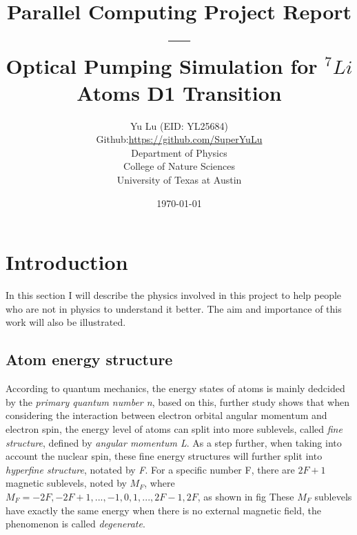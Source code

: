 \documentclass[a4paper, 10pt]{article}
\title{Parallel Computing Project Report --- \\ Optical Pumping Simulation for  $^{7}Li$ Atoms D1 Transition}
\author{
  Yu Lu (EID: YL25684) \\
  Github:\url{https://github.com/SuperYuLu}\\
  Department of Physics \\
  College of Nature Sciences \\
  University of Texas at Austin}
\date{\today}
\begin{document}
\titlepage
\maketitle
\tableofcontents
\newpage
\section{Introduction}
In this section I will describe the physics involved in this project to help people who are not in physics to understand it better. The aim and importance of this work will also be illustrated.

\subsection{Atom energy structure}
According to quantum mechanics, the energy states of atoms is mainly dedcided by the \textit{primary quantum number n}, based on this, further study shows that when considering the interaction between electron orbital angular momentum and electron spin, the energy level of atoms can split into more sublevels, called \textit{fine structure}, defined by \textit{angular momentum L}. As a step further, when taking into account the nuclear spin, these fine energy structures will further split into \textit{hyperfine structure}, notated by \textit{F}. For a specific number F, there are $2F+1$ magnetic sublevels, noted by $M_F$, where $M_F = -2F,  -2F + 1, ..., -1, 0, 1, ..., 2F-1, 2F$, as shown  in fig %
These $M_F$ sublevels have exactly the same energy when there is no external magnetic field, the phenomenon is called \textit{degenerate}. 
\end{document}
